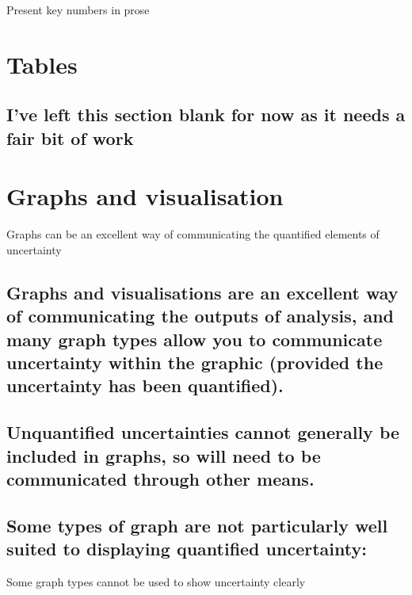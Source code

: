 \documentclass[]{book}
\begin{document}
 Present key numbers in prose

\section{Tables}\label{tables}

\subsection{I've left this section blank for now as it needs a fair bit
of
work}\label{ive-left-this-section-blank-for-now-as-it-needs-a-fair-bit-of-work}

\section{Graphs and visualisation}\label{graphs-and-visualisation}

 Graphs can be an excellent way of communicating the quantified elements
of uncertainty

\subsection{Graphs and visualisations are an excellent way of
communicating the outputs of analysis, and many graph types allow you to
communicate uncertainty within the graphic (provided the uncertainty has
been
quantified).}\label{graphs-and-visualisations-are-an-excellent-way-of-communicating-the-outputs-of-analysis-and-many-graph-types-allow-you-to-communicate-uncertainty-within-the-graphic-provided-the-uncertainty-has-been-quantified.}

\subsection{Unquantified uncertainties cannot generally be included in
graphs, so will need to be communicated through other
means.}\label{unquantified-uncertainties-cannot-generally-be-included-in-graphs-so-will-need-to-be-communicated-through-other-means.}

\subsection{Some types of graph are not particularly well suited to
displaying quantified
uncertainty:}\label{some-types-of-graph-are-not-particularly-well-suited-to-displaying-quantified-uncertainty}

 Some graph types cannot be used to show uncertainty clearly
\end{document}
